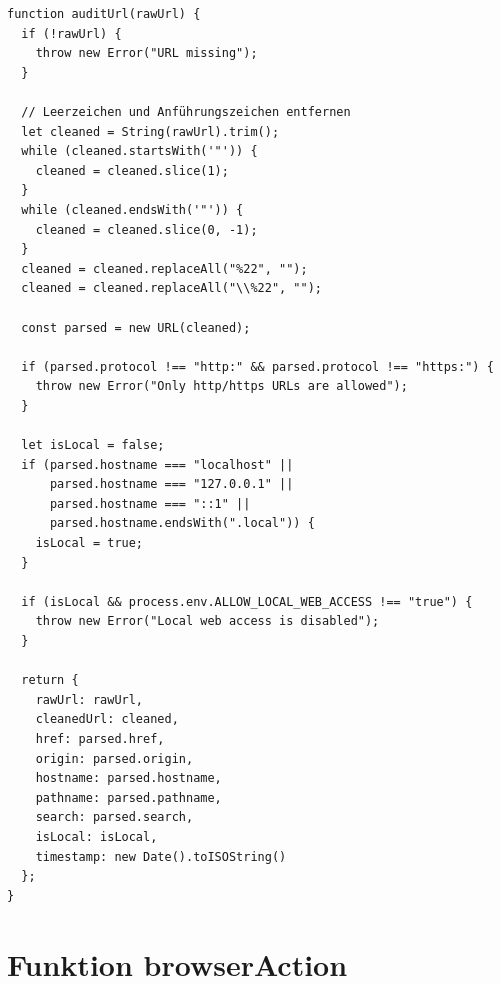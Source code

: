 \begin{lstlisting}
function auditUrl(rawUrl) {
  if (!rawUrl) {
    throw new Error("URL missing");
  }

  // Leerzeichen und Anführungszeichen entfernen
  let cleaned = String(rawUrl).trim();
  while (cleaned.startsWith('"')) {
    cleaned = cleaned.slice(1);
  }
  while (cleaned.endsWith('"')) {
    cleaned = cleaned.slice(0, -1);
  }
  cleaned = cleaned.replaceAll("%22", "");
  cleaned = cleaned.replaceAll("\\%22", "");

  const parsed = new URL(cleaned);

  if (parsed.protocol !== "http:" && parsed.protocol !== "https:") {
    throw new Error("Only http/https URLs are allowed");
  }

  let isLocal = false;
  if (parsed.hostname === "localhost" ||
      parsed.hostname === "127.0.0.1" ||
      parsed.hostname === "::1" ||
      parsed.hostname.endsWith(".local")) {
    isLocal = true;
  }

  if (isLocal && process.env.ALLOW_LOCAL_WEB_ACCESS !== "true") {
    throw new Error("Local web access is disabled");
  }

  return {
    rawUrl: rawUrl,
    cleanedUrl: cleaned,
    href: parsed.href,
    origin: parsed.origin,
    hostname: parsed.hostname,
    pathname: parsed.pathname,
    search: parsed.search,
    isLocal: isLocal,
    timestamp: new Date().toISOString()
  };
}
\end{lstlisting}

\section{Funktion browserAction}

